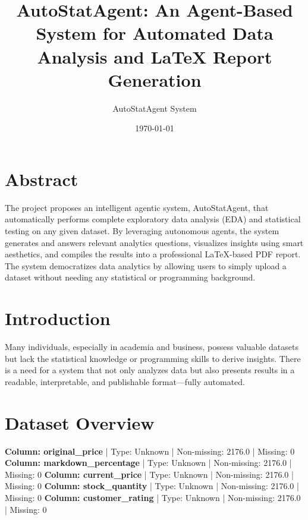 \documentclass{article}%
\title{AutoStatAgent: An Agent-Based System for Automated Data Analysis and LaTeX Report Generation}%
\author{AutoStatAgent System}%
\date{\today}%
\begin{document}
%
\normalsize%
\maketitle%
\section*{Abstract}%
\label{sec:Abstract}%
The project proposes an intelligent agentic system, AutoStatAgent, that automatically performs complete exploratory data analysis (EDA) and statistical testing on any given dataset. By leveraging autonomous agents, the system generates and answers relevant analytics questions, visualizes insights using smart aesthetics, and compiles the results into a professional LaTeX{-}based PDF report. The system democratizes data analytics by allowing users to simply upload a dataset without needing any statistical or programming background.

%
\newpage%
\section{Introduction}%
\label{sec:Introduction}%
Many individuals, especially in academia and business, possess valuable datasets but lack the statistical knowledge or programming skills to derive insights. There is a need for a system that not only analyzes data but also presents results in a readable, interpretable, and publishable format—fully automated.

%
\section{Dataset Overview}%
\label{sec:DatasetOverview}%
\textbf{Column: original\_price}%
 | Type: Unknown | Non{-}missing: 2176.0 | Missing: 0\newline%
\newline%
%
\textbf{Column: markdown\_percentage}%
 | Type: Unknown | Non{-}missing: 2176.0 | Missing: 0\newline%
\newline%
%
\textbf{Column: current\_price}%
 | Type: Unknown | Non{-}missing: 2176.0 | Missing: 0\newline%
\newline%
%
\textbf{Column: stock\_quantity}%
 | Type: Unknown | Non{-}missing: 2176.0 | Missing: 0\newline%
\newline%
%
\textbf{Column: customer\_rating}%
 | Type: Unknown | Non{-}missing: 2176.0 | Missing: 0\newline%
\newline%
\end{document}
